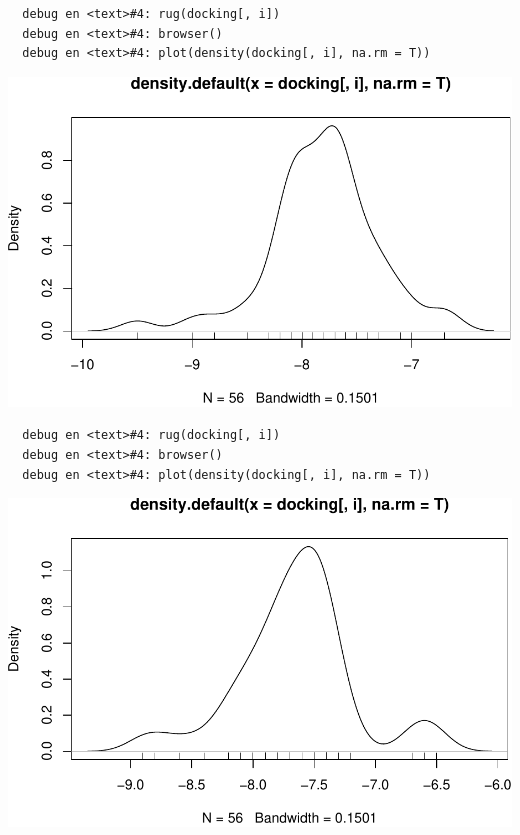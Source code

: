 \documentclass[12pt,twoside]{reedthesis}
\begin{document}
  \begin{verbatim}
  debug en <text>#4: rug(docking[, i])
  debug en <text>#4: browser()
  debug en <text>#4: plot(density(docking[, i], na.rm = T))
  \end{verbatim}
  
  \begin{center}\includegraphics{tesis_files/figure-latex/johan-19} \end{center}
  
  \begin{verbatim}
  debug en <text>#4: rug(docking[, i])
  debug en <text>#4: browser()
  debug en <text>#4: plot(density(docking[, i], na.rm = T))
  \end{verbatim}
  
  \begin{center}\includegraphics{tesis_files/figure-latex/johan-20} \end{center}
  
\end{document}
